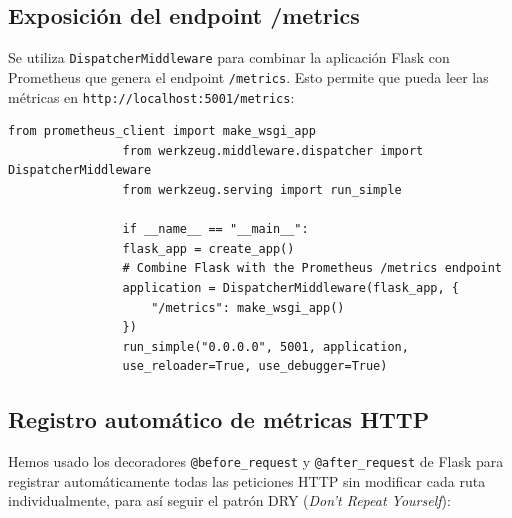 \documentclass[12pt, a4paper]{article}
\begin{document}
		\subsection{Exposición del endpoint /metrics}
		
			Se utiliza \texttt{DispatcherMiddleware} para combinar la aplicación Flask con Prometheus que genera el endpoint \texttt{/metrics}. Esto permite que pueda leer las métricas en
			\texttt{http://localhost:5001/metrics}:
			
			\begin{lstlisting}[style=python, caption=Exposición del endpoint /metrics]
				from prometheus_client import make_wsgi_app
				from werkzeug.middleware.dispatcher import DispatcherMiddleware
				from werkzeug.serving import run_simple
				
				if __name__ == "__main__":
				flask_app = create_app()
				# Combine Flask with the Prometheus /metrics endpoint
				application = DispatcherMiddleware(flask_app, {
					"/metrics": make_wsgi_app()
				})
				run_simple("0.0.0.0", 5001, application,
				use_reloader=True, use_debugger=True)
			\end{lstlisting}
			
		\subsection{Registro automático de métricas HTTP}
		
			Hemos usado los decoradores \texttt{@before\_request} y \texttt{@after\_request} de Flask para registrar automáticamente todas las peticiones HTTP sin modificar cada ruta individualmente, para así seguir el patrón DRY (\textit{Don't Repeat Yourself}):
			
\end{document}
